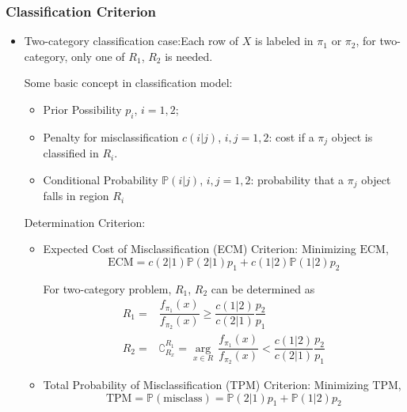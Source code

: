 \subsubsection{Classification Criterion}
\begin{itemize}[topsep=2pt,itemsep=2pt]
    \item Two-category classification case:Each row of $ X $ is labeled in $ \pi_1 $ or $ \pi_2 $, for two-category, only one of $ R_1 $, $ R_2 $ is needed.

    Some basic concept in classification model:
    \begin{itemize}[topsep=2pt,itemsep=2pt]
        \item Prior Possibility $ p_i $, $ i=1,2 $;
        \item Penalty for misclassification $ c(i|j) $, $ i,j=1,2 $: cost if a $ \pi_j $ object is classified in $ R_i $.
        \item Conditional Probability $ \mathbb{P}(i|j) $, $ i,j=1,2 $: probability that a $ \pi_j $ object falls in region $ R_i $
    \end{itemize}

    \begin{point}
Determination Criterion:
    \end{point}
\begin{itemize}[topsep=2pt,itemsep=2pt]
    \item Expected Cost of Misclassification (ECM) Criterion: Minimizing $ \mathrm{ECM} $,
    \begin{equation}
        \mathrm{ECM}=c(2|1)\mathbb{P}(2|1)p_1+c(1|2)\mathbb{P}(1|2)p_2 
    \end{equation}
    
    For two-category problem, $ R_1 $, $ R_2 $ can be determined as
    \begin{align}
        R_1=&\dfrac{f_{\pi_1}(x)}{f_{\pi_2}(x)}\geq \dfrac{c(1|2)}{c(2|1)}\dfrac{p_2}{p_1}\\
        R_2=&\complement_{R_x}^{R_1}=\mathop{\arg}\limits_{x\in R} \,  \dfrac{f_{\pi_1}(x)}{f_{\pi_2}(x)}<\dfrac{c(1|2)}{c(2|1)}\dfrac{p_2}{p_1}
    \end{align}
    \item Total Probability of Misclassification (TPM) Criterion: Minimizing $\mathrm{TPM}$,
    \begin{equation}
        \mathrm{TPM}=\mathbb{P}(\mathrm{misclass})=\mathbb{P}(2|1)p_1+\mathbb{P}(1|2)p_2 
    \end{equation}


\end{itemize}
\end{itemize}
